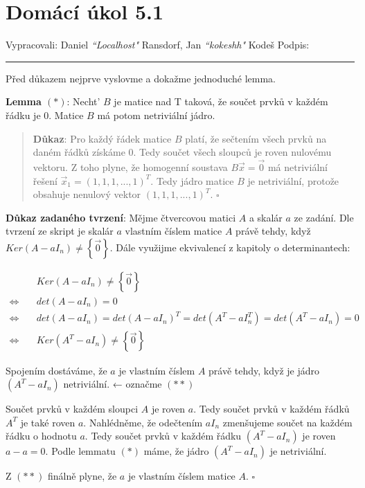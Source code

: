 \documentclass[12pt]{article}
\begin{document}
\section*{Domácí úkol 5.1}

Vypracovali: Daniel \textit{``Localhost"} Ransdorf, Jan \textit{``kokeshh"} Kodeš \hfill Podpis: \rule{4cm}{0.4pt}


\bigskip

Před důkazem nejprve vyslovme a dokažme jednoduché lemma.

\textbf{Lemma $(*)$}: Necht' $B$ je matice nad T taková, že součet prvků v každém řádku je 0.
Matice $B$ má potom netriviální jádro.

\begin{quotation}
  \textbf{Důkaz}: Pro každý řádek matice $B$ platí, že sečtením všech prvků na daném řádků získáme 0.
    Tedy součet všech sloupců je roven nulovému vektoru.
    Z toho plyne, že homogenní soustava $B\vec{x} = \vec{0}$ má netriviální řešení $\vec{x}_1 = (1,1,1,...,1)^T$.
    Tedy jádro matice $B$ je netriviální, protože obsahuje nenulový vektor $(1,1,1,...,1)^T$. \quad $\square$
\end{quotation}

\textbf{Důkaz zadaného tvrzení}:
Mějme čtvercovou matici $A$ a skalár $a$ ze zadání. Dle tvrzení ze skript je skalár $a$ vlastním
číslem matice $A$ právě tehdy, když $Ker\left(A-aI_n\right) \neq \left\{\vec{0}\right\}$.
Dále využijme ekvivalencí z kapitoly o determinantech:

\begin{align*}
  &Ker\left(A-aI_n\right) \neq \left\{\vec{0}\right\} \\
  \Longleftrightarrow \quad
  &det\left(A-aI_n\right) = 0 \\
  \Longleftrightarrow \quad
  &det\left(A-aI_n\right) = det\left(A-aI_n\right)^T
  = det\left(A^T-aI_n^T\right) = det\left(A^T-aI_n\right) = 0 \\
  \Longleftrightarrow \quad
  &Ker\left(A^T-aI_n\right) \neq \left\{\vec{0}\right\}
\end{align*}

Spojením dostáváme, že $a$ je vlastním číslem $A$ právě tehdy, když je jádro $(A^T-aI_n)$ netriviální. ← označme $(**)$

Součet prvků v každém sloupci $A$ je roven $a$. Tedy součet prvků v každém řádků $A^T$ je také roven $a$.
Nahlédněme, že odečtením $aI_n$ zmenšujeme součet na každém řádku o hodnotu $a$.
Tedy součet prvků v každém řádku $(A^T-aI_n)$ je roven $a - a = 0$.
Podle lemmatu $(*)$ máme, že jádro $(A^T-aI_n)$ je netriviální.

Z $(**)$ finálně plyne, že $a$ je vlastním číslem matice $A$. \quad $\square$
  
\end{document}
